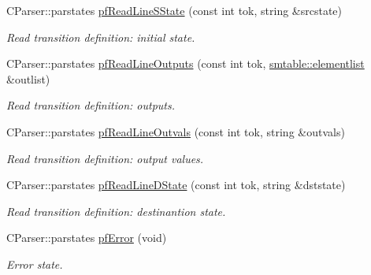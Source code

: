 \begin{DoxyCompactItemize}
C\+Parser\+::parstates \mbox{\hyperlink{class_c_parser_a76394c5f5b9c8b8028c80208d5712973}{pf\+Read\+Line\+S\+State}} (const int tok, string \&srcstate)
\begin{DoxyCompactList}\small\item\em Read transition definition\+: initial state. \end{DoxyCompactList}\item 
C\+Parser\+::parstates \mbox{\hyperlink{class_c_parser_a16b1a21e69fdfb4d45e6e22125d8e09b}{pf\+Read\+Line\+Outputs}} (const int tok, \mbox{\hyperlink{classsmtable_a5eb5f5f14b1e52a2bde73255ea71927f}{smtable\+::elementlist}} \&outlist)
\begin{DoxyCompactList}\small\item\em Read transition definition\+: outputs. \end{DoxyCompactList}\item 
C\+Parser\+::parstates \mbox{\hyperlink{class_c_parser_a045e513433708fabe6251864484f40c9}{pf\+Read\+Line\+Outvals}} (const int tok, string \&outvals)
\begin{DoxyCompactList}\small\item\em Read transition definition\+: output values. \end{DoxyCompactList}\item 
C\+Parser\+::parstates \mbox{\hyperlink{class_c_parser_ad9edeb2bec770d60f64525f3c3471f98}{pf\+Read\+Line\+D\+State}} (const int tok, string \&dststate)
\begin{DoxyCompactList}\small\item\em Read transition definition\+: destinantion state. \end{DoxyCompactList}\item 
C\+Parser\+::parstates \mbox{\hyperlink{class_c_parser_ac7a3ad0083e1bfd94b2207bb13792363}{pf\+Error}} (void)
\begin{DoxyCompactList}\small\item\em Error state. \end{DoxyCompactList}\end{DoxyCompactItemize}
